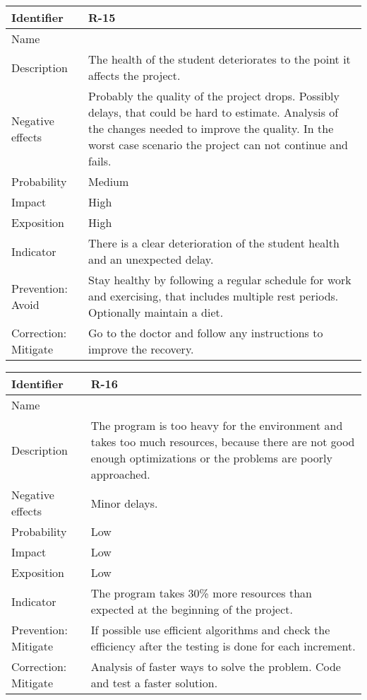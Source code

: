 \begin{table}[H]
	\begin{tabularx}{\textwidth}{|y|z|}
		\hline
		Identifier & \textbf{R-15} \\ \hline
		Name & \Rquince \\ \hline
		Description &
			The health of the student deteriorates to the point it affects the project.
		\\ \hline
		Negative effects &
			Probably the quality of the project drops. \linej
			Possibly delays, that could be hard to estimate. \linej
			Analysis of the changes needed to improve the quality. \linej
			In the worst case scenario the project can not continue and fails.
		\\ \hline
		Probability & Medium\\ \hline
		Impact &  High\\ \hline
		Exposition &  High\\ \hline
		Indicator & There is a clear deterioration of the student health and an unexpected delay. \\ \hline
		Prevention: Avoid &
			Stay healthy by following a regular schedule for work and exercising, that includes multiple rest periods. \linej
			Optionally maintain a diet.
		\\ \hline
		Correction: Mitigate &
			Go to the doctor and follow any instructions to improve the recovery.
		\\ \hline
	\end{tabularx}
\end{table}

\begin{table}[H]
	\begin{tabularx}{\textwidth}{|y|z|}
		\hline
		Identifier & \textbf{R-16} \\ \hline
		Name & \Rdieciseis \\ \hline
		Description &
			The program is too heavy for the environment and takes too much resources, because there are not good enough optimizations or the problems are poorly approached.
		\\ \hline
		Negative effects &
			Minor delays. \linej
		\\ \hline
		Probability & Low\\ \hline
		Impact &  Low\\ \hline
		Exposition &  Low\\ \hline
		Indicator & The program takes 30\% more resources than expected at the beginning of the project.\\ \hline
		Prevention: Mitigate &
			If possible use efficient algorithms and check the efficiency after the testing is done for each increment.
		\\ \hline
		Correction: Mitigate &
			Analysis of faster ways to solve the problem.\linej
			Code and test a faster solution.
		\\ \hline
	\end{tabularx}
\end{table}

